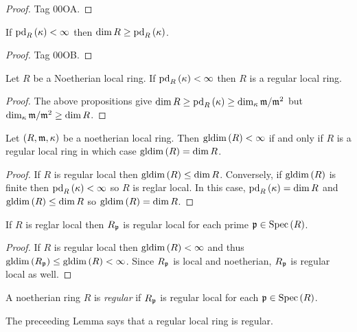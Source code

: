 \documentclass[12pt]{article}
\begin{document}
\begin{proof}
Tag 00OA.
\end{proof}

\begin{prop}
If $\mathrm{pd}_{R} \left( \kappa \right) < \infty$ then $\dim{R} \ge \mathrm{pd}_{R} \left( \kappa \right)$.
\end{prop}

\begin{proof}
Tag 00OB.
\end{proof}

\begin{prop}
Let $R$ be a Noetherian local ring. If $\mathrm{pd}_{R} \left( \kappa \right) < \infty$ then $R$ is a regular local ring.
\end{prop}

\begin{proof}
The above propositions give $\dim{R} \ge \mathrm{pd}_{R} \left( \kappa \right) \ge \dim_\kappa \mathfrak{m} / \mathfrak{m}^2$ but $\dim_\kappa \mathfrak{m} / \mathfrak{m}^2 \ge \dim{R}$.
\end{proof}

\begin{prop}
Let $(R, \mathfrak{m}, \kappa)$ be a noetherian local ring. Then $\mathrm{gldim}\left( R \right) < \infty$ if and only if $R$ is a regular local ring in which case $\mathrm{gldim}\left( R \right) = \dim{R}$.
\end{prop}

\begin{proof}
If $R$ is regular local then $\mathrm{gldim}\left( R \right) \le \dim{R}$. Conversely, if $\mathrm{gldim}\left( R \right)$ is finite then $\mathrm{pd}_{R} \left( \kappa \right) < \infty$ so $R$ is reglar local. In this case, $\mathrm{pd}_{R} \left( \kappa \right) = \dim{R}$ and $\mathrm{gldim}\left( R \right) \le \dim{R}$ so $\mathrm{gldim}\left( R \right) = \dim{R}$.
\end{proof}

\begin{lemma}
If $R$ is reglar local then $R_{\mathfrak{p}}$ is regular local for each prime $\mathfrak{p} \in \mathrm{Spec}\left( R \right)$.
\end{lemma}

\begin{proof}
If $R$ is regular local then $\mathrm{gldim}\left( R \right) < \infty$ and thus $\mathrm{gldim}\left( R_{\mathfrak{p}} \right) \le \mathrm{gldim}\left( R \right) < \infty$. Since $R_{\mathfrak{p}}$ is local and noetherian, $R_{\mathfrak{p}}$ is regular local as well.
\end{proof}

\begin{defn}
A noetherian ring $R$ is \textit{regular} if $R_{\mathfrak{p}}$ is regular local for each $\mathfrak{p} \in \mathrm{Spec}\left( R \right)$.
\end{defn}

\begin{rmk}
The preceeding Lemma says that a regular local ring is regular. 
\end{rmk}
\end{document}
